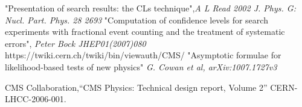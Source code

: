 \begin{thebibliography}{9}
 "Presentation of search results: the CLs technique",\textit{A L Read 2002 J. Phys. G: Nucl. Part. Phys. 28 2693}
 "Computation of confidence levels for search experiments with fractional event counting and the treatment of systematic errors", \textit{Peter Bock JHEP01(2007)080}
 https://twiki.cern.ch/twiki/bin/viewauth/CMS/
  "Asymptotic formulae for likelihood-based tests of new physics" \textit{G. Cowan et al, arXiv:1007.1727v3}

CMS Collaboration,``CMS Physics: Technical design report, Volume 2'' CERN-LHCC-2006-001.

\end{thebibliography}